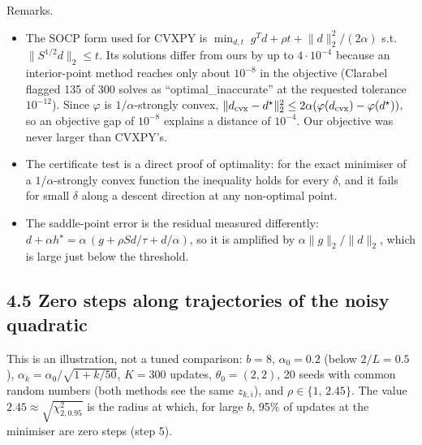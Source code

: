 \documentclass[11pt,a4paper]{article}
\newcommand{\norm}[1]{\lVert #1\rVert_2}
\begin{document}
Remarks.
\begin{itemize}
\item The SOCP form used for CVXPY is
$\min_{d,t}\;g^Td+\rho t+\norm d^2/(2\alpha)$ s.t.\ $\norm{S^{1/2}d}\le t$. Its
solutions differ from ours by up to $4\cdot10^{-4}$ because an interior-point method
reaches only about $10^{-8}$ in the objective (Clarabel flagged 135 of 300 solves as
``optimal\_inaccurate'' at the requested tolerance $10^{-12}$). Since $\varphi$ is
$1/\alpha$-strongly convex, $\norm{d_{\rm cvx}-d^\star}^2\le2\alpha(\varphi(d_{\rm cvx})-\varphi(d^\star))$,
so an objective gap of $10^{-8}$ explains a distance of $10^{-4}$. Our objective was
never larger than CVXPY's.
\item The certificate test is a direct proof of optimality: for the exact minimiser of
a $1/\alpha$-strongly convex function the inequality holds for every $\delta$, and it
fails for small $\delta$ along a descent direction at any non-optimal point.
\item The saddle-point error is the residual measured differently:
$d+\alpha h^\star=\alpha\,(g+\rho Sd/\tau+d/\alpha)$, so it is amplified by
$\alpha\norm g/\norm d$, which is large just below the threshold.
\end{itemize}

\subsection*{4.5 Zero steps along trajectories of the noisy quadratic}

This is an illustration, not a tuned comparison: $b=8$, $\alpha_0=0.2$ (below
$2/L=0.5$), $\alpha_k=\alpha_0/\sqrt{1+k/50}$, $K=300$ updates, $\theta_0=(2,2)$, 20
seeds with common random numbers (both methods see the same $z_{k,i}$), and
$\rho\in\{1,\,2.45\}$. The value $2.45\approx\sqrt{\chi^2_{2,0.95}}$ is the radius at
which, for large $b$, 95\% of updates at the minimiser are zero steps (step 5).
\end{document}
